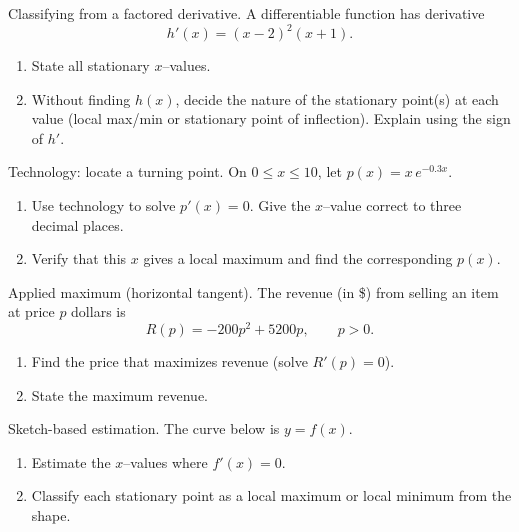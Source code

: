 \documentclass[11pt]{article}
\def\textbf#1{#1}%
\newcounter{question}
\begin{document}
\begin{question}
\textbf{Classifying from a factored derivative.}
A differentiable function has derivative
\[
h'(x)=(x-2)^{2}(x+1).
\]
\begin{enumerate}
  \item State all stationary $x$–values.
  \item Without finding $h(x)$, decide the nature of the stationary point(s) at each value (local max/min or stationary point of inflection). Explain using the sign of $h'$.
\end{enumerate}
\end{question}

\begin{question}
\textbf{Technology: locate a turning point.}
On $0\le x\le 10$, let $p(x)=x\,e^{-0.3x}$.
\begin{enumerate}
  \item Use technology to solve $p'(x)=0$. Give the $x$–value correct to three decimal places.
  \item Verify that this $x$ gives a local maximum and find the corresponding $p(x)$.
\end{enumerate}
\end{question}

\begin{question}
\textbf{Applied maximum (horizontal tangent).}
The revenue (in \$) from selling an item at price $p$ dollars is
\[
R(p)=-200p^{2}+5200p,\qquad p>0.
\]
\begin{enumerate}
  \item Find the price that maximizes revenue (solve $R'(p)=0$).
  \item State the maximum revenue.
\end{enumerate}
\end{question}

\begin{question}
\textbf{Sketch-based estimation.}
The curve below is $y=f(x)$.

\begin{center}
\end{center}

\begin{enumerate}
  \item Estimate the $x$–values where $f'(x)=0$.
  \item Classify each stationary point as a local maximum or local minimum from the shape.
\end{enumerate}
\end{question}
\end{document}
